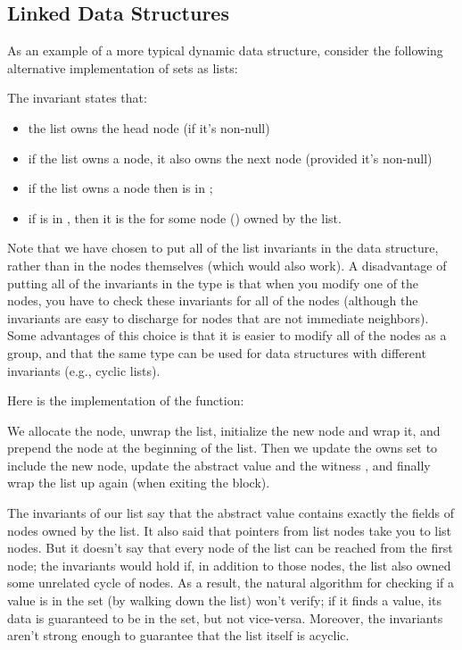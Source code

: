 \subsection{Linked Data Structures}
As an example of a more typical dynamic data structure, consider 
the following alternative implementation of  sets as lists:


\noindent
The invariant states that:
\begin{itemize}
\item the list owns the head node (if it's non-null)
\item if the list owns a node, it also owns the next node (provided it's non-null)
\item if the list owns a node  then  is in ;
\item if  is in , then it is the  for some
  node () owned by the list.
\end{itemize}

Note that we have chosen to put all of the list
invariants in the  data structure, rather than in the nodes
themselves (which would also work). A disadvantage of putting all of
the invariants in the  type is that when you modify one of
the nodes, you have to check these invariants for all of the nodes
(although the invariants are easy to discharge for nodes that are not
immediate neighbors). Some advantages of this choice is that it is
easier to modify all of the nodes as a group, and that the same
 type can be used for data structures with different
invariants (e.g., cyclic lists).

Here is the implementation of the  function:


\noindent
We allocate the node, unwrap the list, initialize the new node and
wrap it, and prepend the node at the beginning of the list.  Then we
update the owns set to include the new node, update the abstract value
 and the witness , and finally wrap the list up
again (when exiting the  block). 

The invariants of our list say that the abstract value contains
exactly the  fields of nodes owned by the list. It also said
that pointers from list nodes take you to list nodes. But it doesn't
say that every node of the list can be reached from the first node;
the invariants would hold if, in addition to those nodes, the list
also owned some unrelated cycle of nodes. As a result, the natural
algorithm for checking if a value is in the set (by walking down the
list) won't verify; if it finds a value, its data is guaranteed to be
in the set, but not vice-versa. Moreover, the invariants aren't strong
enough to guarantee that the list itself is acyclic.

